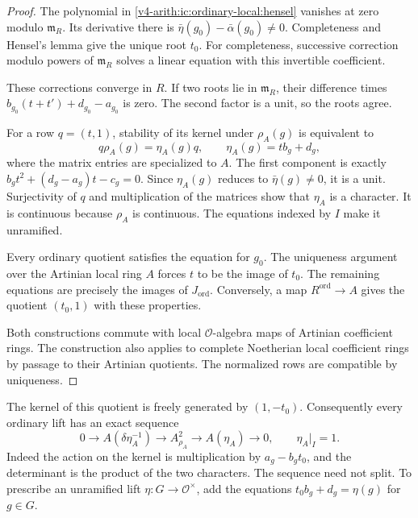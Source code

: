 \begin{proof}
The polynomial in \eqref{v4-arith:ic:ordinary-local:hensel} vanishes at
zero modulo $\mathfrak m_R$. Its derivative there is
$\bar\eta(g_0)-\bar\alpha(g_0)\ne0$.
Completeness and Hensel's lemma give the unique root $t_0$.
For completeness, successive correction modulo powers of
$\mathfrak m_R$ solves a linear equation with this invertible
coefficient.

These corrections converge in $R$.
If two roots lie in $\mathfrak m_R$, their difference times
$b_{g_0}(t+t')+d_{g_0}-a_{g_0}$ is zero. The second factor is a
unit, so the roots agree.

For a row $q=(t,1)$, stability of its kernel under $\rho_A(g)$
is equivalent to
\[
 q\rho_A(g)=\eta_A(g)q,\qquad
 \eta_A(g)=t b_g+d_g,
\]
where the matrix entries are specialized to $A$.
The first component is exactly
$b_gt^2+(d_g-a_g)t-c_g=0$.
Since $\eta_A(g)$ reduces to $\bar\eta(g)\ne0$, it is a unit.
Surjectivity of $q$ and multiplication of the matrices show that
$\eta_A$ is a character. It is continuous because $\rho_A$ is
continuous. The equations indexed by $I$ make it unramified.

Every ordinary quotient satisfies the equation for $g_0$.
The uniqueness argument over the Artinian local ring $A$ forces
$t$ to be the image of $t_0$.
The remaining equations are precisely the images of
$J_{\mathrm{ord}}$. Conversely, a map $R^{\mathrm{ord}}\to A$
gives the quotient $(t_0,1)$ with these properties.

Both constructions commute with local $\mathcal O$-algebra maps
of Artinian coefficient rings. The construction also applies to
complete Noetherian local coefficient rings by passage to their Artinian
quotients. The normalized rows are compatible by uniqueness.
\end{proof}

The kernel of this quotient is freely generated by $(1,-t_0)$.
Consequently every ordinary lift has an exact sequence
\begin{equation}
\label{v4-arith:ic:ordinary-local:sequence}
 0\longrightarrow A(\delta\eta_A^{-1})
 \longrightarrow A^2_{\rho_A}
 \longrightarrow A(\eta_A)\longrightarrow0,
 \qquad \eta_A|_I=1.
\end{equation}
Indeed the action on the kernel is multiplication by
$a_g-b_gt_0$, and the determinant is the product of the two
characters. The sequence need not split.
To prescribe an unramified lift $\eta:G\to\mathcal O^\times$,
add the equations $t_0b_g+d_g=\eta(g)$ for $g\in G$.

